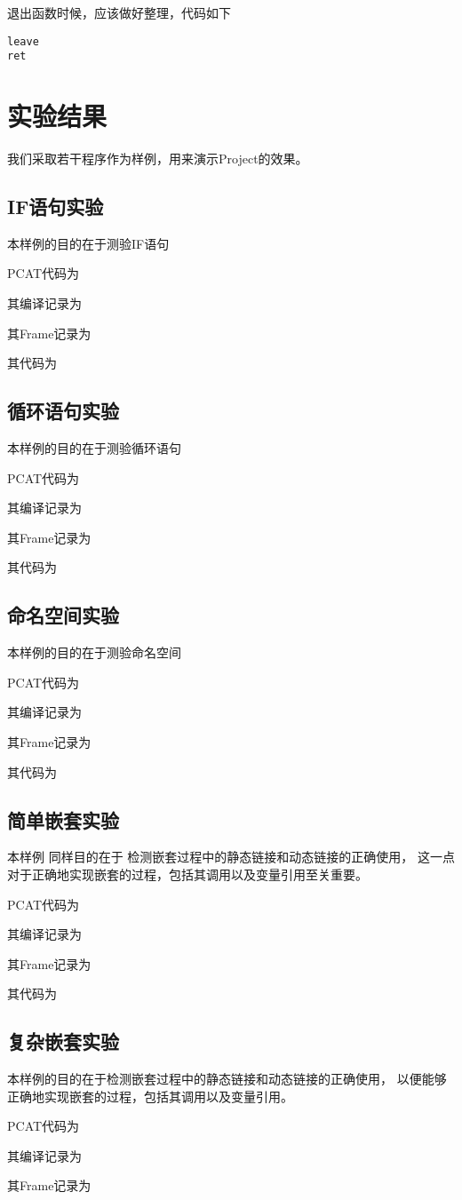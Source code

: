 ﻿\documentclass{article}
\begin{document}
退出函数时候，应该做好整理，代码如下
\begin{lstlisting}
leave
ret
\end{lstlisting}


\section{实验结果}

我们采取若干程序作为样例，用来演示Project的效果。

\subsection{IF语句实验}
本样例的目的在于测验IF语句

PCAT代码为

其编译记录为

其Frame记录为

其代码为


\subsection{循环语句实验}
本样例的目的在于测验循环语句

PCAT代码为

其编译记录为

其Frame记录为

其代码为


\subsection{命名空间实验}
本样例的目的在于测验命名空间

PCAT代码为

其编译记录为

其Frame记录为

其代码为




\subsection{简单嵌套实验}
本样例
同样目的在于
检测嵌套过程中的静态链接和动态链接的正确使用，
这一点对于正确地实现嵌套的过程，包括其调用以及变量引用至关重要。


PCAT代码为

其编译记录为

其Frame记录为

其代码为



\subsection{复杂嵌套实验}
本样例的目的在于检测嵌套过程中的静态链接和动态链接的正确使用，
以便能够正确地实现嵌套的过程，包括其调用以及变量引用。

PCAT代码为

其编译记录为

其Frame记录为

\end{document}
